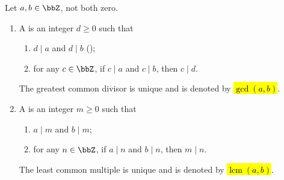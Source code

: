 \begin{definition} \label{definition:gcd_and_lcm_of_integers}
    Let $a, b \in \bbZ$, not both zero.
    \begin{enumerate}
        \item A  is an integer $d \geq 0$ such that
            \begin{enumerate}
                \item $d \mid a$ and $d \mid b$ ();
                \item for any $c \in \bbZ$, if $c \mid a$ and $c \mid b$, then $c \mid d$.
            \end{enumerate}
        The greatest common divisor is unique and is denoted by \hl{$\gcd(a, b)$}.
        \item A  is an integer $m \geq 0$ such that
            \begin{enumerate}
                \item $a \mid m$ and $b \mid m$;
                \item for any $n \in \bbZ$, if $a \mid n$ and $b \mid n$, then $m \mid n$.
            \end{enumerate}
        The least common multiple is unique and is denoted by \hl{$\operatorname{lcm}(a, b)$}.
    \end{enumerate}
\end{definition}

